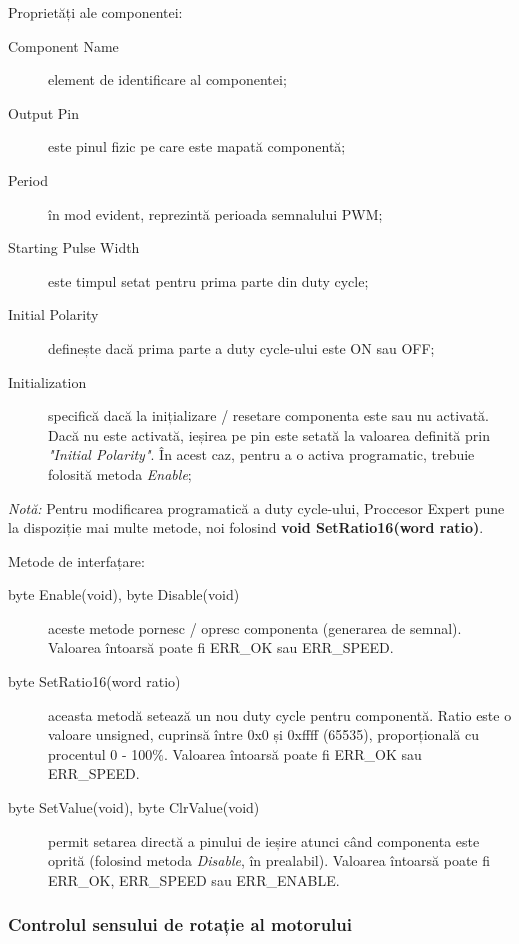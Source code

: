 Proprietăți ale componentei:

\begin{description}
    \item[Component Name] element de identificare al componentei;
    \item[Output Pin] este pinul fizic pe care este mapată componentă;
    \item[Period] în mod evident, reprezintă perioada semnalului PWM;
    \item[Starting Pulse Width] este timpul setat pentru prima parte din duty cycle; 
    \item[Initial Polarity] definește dacă prima parte a duty cycle-ului este ON sau OFF;
    \item[Initialization] specifică dacă la inițializare / resetare componenta este sau nu activată. Dacă nu este activată, ieșirea pe pin este setată la valoarea definită prin \textit{"Initial Polarity"}. În acest caz, pentru a o activa programatic, trebuie folosită metoda \textit{Enable}; 
\end{description}

\textit{Notă:} Pentru modificarea programatică a duty cycle-ului, Proccesor Expert pune la dispoziție mai multe metode, noi folosind \textbf{void SetRatio16(word ratio)}.

Metode de interfațare:

\begin{description}
    \item[byte Enable(void), byte Disable(void)] aceste metode pornesc / opresc componenta (generarea de semnal). Valoarea întoarsă poate fi ERR\_OK sau ERR\_SPEED.
    \item[byte SetRatio16(word ratio)] aceasta metodă setează un nou duty cycle pentru componentă. Ratio este o valoare unsigned, cuprinsă între 0x0 și 0xffff (65535), proporțională cu procentul 0 - 100\%. Valoarea întoarsă poate fi ERR\_OK sau ERR\_SPEED.
    \item[byte SetValue(void), byte ClrValue(void)] permit setarea directă a pinului de ieșire atunci când componenta este oprită (folosind metoda \textit{Disable}, în prealabil). Valoarea întoarsă poate fi ERR\_OK, ERR\_SPEED sau ERR\_ENABLE.
\end{description}



\subsubsection{Controlul sensului de rotație al motorului}

